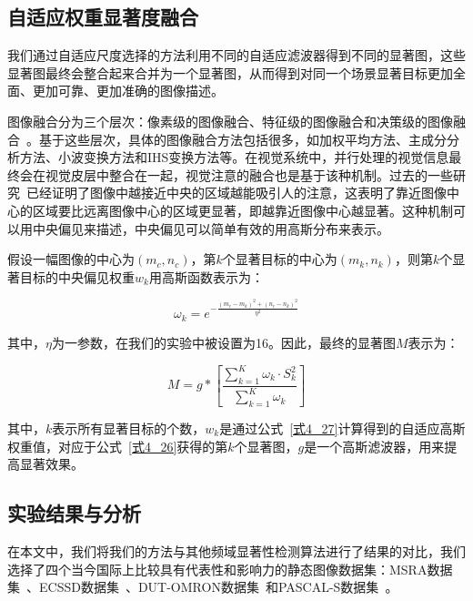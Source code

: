 \subsection{自适应权重显著度融合}
\label{4_2_3}

我们通过自适应尺度选择的方法利用不同的自适应滤波器得到不同的显著图，这些显著图最终会整合起来合并为一个显著图，从而得到对同一个场景显著目标更加全面、更加可靠、更加准确的图像描述。

图像融合分为三个层次：像素级的图像融合、特征级的图像融合和决策级的图像融合~\cite{吕超峰2007融合}。基于这些层次，具体的图像融合方法包括很多，如加权平均方法、主成分分析方法、小波变换方法和IHS变换方法等。在视觉系统中，并行处理的视觉信息最终会在视觉皮层中整合在一起，视觉注意的融合也是基于该种机制。过去的一些研究~\cite{JuddICCV2009Learning}已经证明了图像中越接近中央的区域越能吸引人的注意，这表明了靠近图像中心的区域要比远离图像中心的区域更显著，即越靠近图像中心越显著。这种机制可以用中央偏见来描述，中央偏见可以简单有效的用高斯分布来表示。

假设一幅图像的中心为$(m_{c},n_{c})$，第$k$个显著目标的中心为$(m_{k},n_{k})$，则第$k$个显著目标的中央偏见权重$w_{k}$用高斯函数表示为：
\begin{linenomath}
\begin{equation}
\omega_k=e^{-\frac{(m_{c}-m_{k})^{2}+(n_{c}-n_{k})^{2}}{\eta ^{2}}}
\label{式4_27}
\end{equation}
\end{linenomath}
其中，$\eta$为一参数，在我们的实验中被设置为16。因此，最终的显著图$M$表示为：
\begin{linenomath}
\begin{equation}
M=g\ast \left[\frac{\sum_{k=1}^{K}\omega_{k}\cdot S_{k}^{2}}{\sum_{k=1}^{K}\omega_{k}}\right]
\label{式4_28}
\end{equation}
\end{linenomath}
其中，$k$表示所有显著目标的个数，$w_{k}$是通过公式~\ref{式4_27}计算得到的自适应高斯权重值，对应于公式~\ref{式4_26}获得的第$k$个显著图，$g$是一个高斯滤波器，用来提高显著效果。

\subsection{实验结果与分析}
\label{4_2_4}

在本文中，我们将我们的方法与其他频域显著性检测算法进行了结果的对比，我们选择了四个当今国际上比较具有代表性和影响力的静态图像数据集：MSRA数据集~\cite{LiuTieCVPR2007Learning}、ECSSD数据集~\cite{YanQiongCVPR2013Hierarchical}、DUT-OMRON数据集~\cite{YangChuanCVPR2013Manifold}和PASCAL-S数据集~\cite{LiYinCVPR2014Secrets}。

